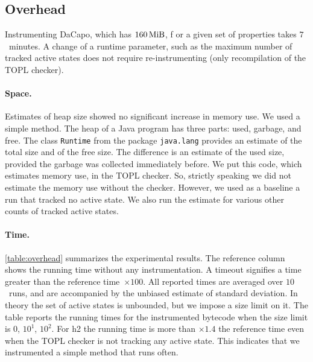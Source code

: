 \documentclass[9pt, preprint]{sigplanconf} %
\theoremstyle{definition}
\theoremstyle{remark}
\begin{document}
\subsection{Overhead} %

Instrumenting DaCapo, which has $160\rm\,MiB$, f or a given set of properties takes $7$~minutes.
A change of a runtime parameter, such as the maximum number of tracked active states
does not require re-instrumenting (only recompilation of the TOPL checker).

\paragraph{Space.}
Estimates of heap size showed no significant increase in memory use.
We used a simple method.
The heap of a Java program has three parts: used, garbage, and free.
The class {\tt Runtime} from the package {\tt java.lang} provides an estimate of the total size and of the free size.
The difference is an estimate of the used size, provided the garbage was collected immediately before.
We put this code, which estimates memory use, in the TOPL checker.
So, strictly speaking we did not estimate the memory use without the checker.
However, we used as a baseline a run that tracked no active state.
We also run the estimate for various other counts of tracked active states.

\paragraph{Time.}
\autoref{table:overhead} summarizes the experimental results.
The reference column shows the running time without any instrumentation.
A timeout signifies a time greater than the reference time~$\times100$.
All reported times are averaged over $10$~runs, and are accompanied by the unbiased estimate of standard deviation.
In theory the set of active states is unbounded, but we impose a size limit on it.
The table reports the running times for the instrumented bytecode when the size limit is $0$, $10^1$, $10^2$.
%
For h2 the running time is more than $\times1.4$ the reference time even when the TOPL checker is not tracking any active state.
This indicates that we instrumented a simple method that runs often.
\end{document}
